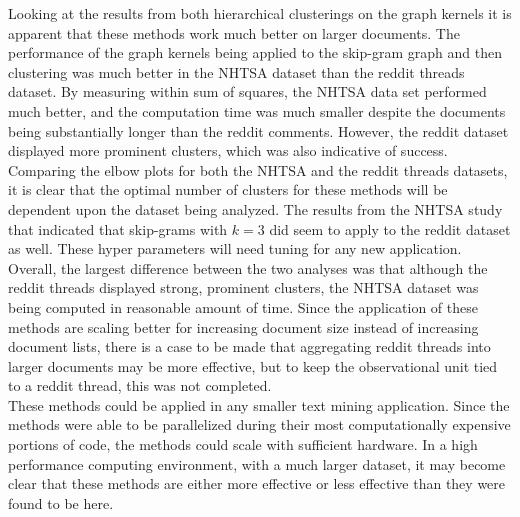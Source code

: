 Looking at the results from both hierarchical clusterings on the graph kernels it is apparent that these methods work much better on larger documents. The performance of the graph kernels being applied to the skip-gram graph and then clustering was much better in the NHTSA dataset than the reddit threads dataset. By measuring within sum of squares, the NHTSA data set performed much better, and the computation time was much smaller despite the documents being substantially longer than the reddit comments. However, the reddit dataset displayed more prominent clusters, which was also indicative of success.\\
Comparing the elbow plots for both the NHTSA and the reddit threads datasets, it is clear that the optimal number of clusters for these methods will be dependent upon the dataset being analyzed. The results from the NHTSA study that indicated that skip-grams with $k=3$ did seem to apply to the reddit dataset as well. These hyper parameters will need tuning for any new application.\\
Overall, the largest difference between the two analyses was that although the reddit threads displayed strong, prominent clusters, the NHTSA dataset was being computed in reasonable amount of time. Since the application of these methods are scaling better for increasing document size instead of increasing document lists, there is a case to be made that aggregating reddit threads into larger documents may be more effective, but to keep the observational unit tied to a reddit thread, this was not completed.\\ 
These methods could be applied in any smaller text mining application. Since the methods were able to be parallelized during their most computationally expensive portions of code, the methods could scale with sufficient hardware. In a high performance computing environment, with a much larger dataset, it may become clear that these methods are either more effective or less effective than they were found to be here.


 

 


